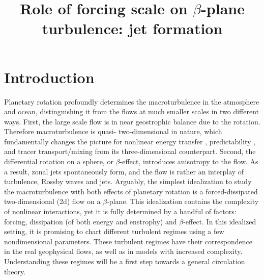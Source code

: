 \documentclass{ametsoc}
\title{Role of forcing scale on $\beta$-plane turbulence: jet formation}
\affiliation{Atmospheric and Oceanic Sciences Program, Princeton University, Princeton, New Jersey}
\begin{document}
\maketitle


%
\section{Introduction}

Planetary rotation profoundly determines the macroturbulence in the
atmosphere and ocean, distinguishing it from the flows at much smaller
scales in two different ways. First, the large scale flow is in near
geostrophic balance due to the rotation. Therefore macroturbulence
is quasi- two-dimensional in nature, which fundamentally changes the
picture for nonlinear energy transfer \citep{Kraichnan1967,Charney1971},
predictability \citep{Leith1971,Leith1972}, and tracer transport/mixing
\citep{Batchelor1959,Shuckburgh2003} from its three-dimensional counterpart.
Second, the differential rotation on a sphere, or $\beta$-effect,
introduces anisotropy to the flow. As a result, zonal jets spontaneously
form, and the flow is rather an interplay of turbulence, Rossby waves
and jets. Arguably, the simplest idealization to study the macroturbulence
with both effects of planetary rotation is a forced-dissipated two-dimensional
(2d) flow on a $\beta$-plane. This idealization contains the complexity
of nonlinear interactions, yet it is fully determined by a handful
of factors: forcing, dissipation (of both energy and enstrophy) and
$\beta$-effect. In this idealized setting, it is promising to chart
different turbulent regimes using a few nondimensional parameters.
These turbulent regimes have their correspondence in the real geophysical
flows, as well as in models with increased complexity. Understanding
these regimes will be a first step towards a general circulation theory.
\end{document}
